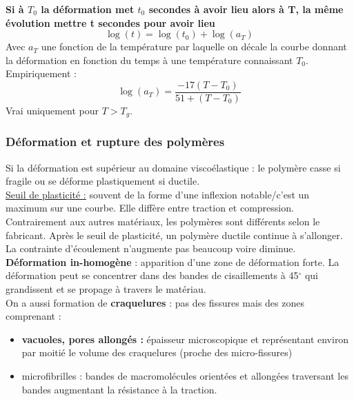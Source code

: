 \documentclass[../main.tex]{subfiles}
\begin{document}
\textbf{Si à $T_0$ la déformation met $t_0$ secondes à avoir lieu alors à T, la même évolution mettre t secondes pour avoir lieu}\\
\begin{equation}
    \log(t) = \log(t_0) + \log(a_T)
\end{equation}
Avec $a_T$ une fonction de la température par laquelle on décale la courbe donnant la déformation en fonction du temps à une température connaissant $T_0$. Empiriquement :\\
\begin{equation}
    \log(a_T) = \frac{-17(T-T_0)}{51+(T-T_0)}
\end{equation}
\warning Vrai uniquement pour $T>T_g$. \\

\subsubsection{Déformation et rupture des polymères}
Si la déformation est supérieur au domaine viscoélastique : le polymère casse si fragile ou se déforme plastiquement si ductile.\\

\quad \underline{Seuil de plasticité :} souvent de la forme d'une inflexion notable/c'est un maximum sur une courbe. Elle diffère entre traction et compression.\\

Contrairement aux autres matériaux, les polymères sont différents selon le fabricant. Après le seuil de plasticité, un polymère ductile continue à s'allonger. La contrainte d'écoulement n'augmente pas beaucoup voire diminue. \textbf{Déformation in-homogène} : apparition d'une zone de déformation forte. La déformation peut se concentrer dans des bandes de cisaillements à 45$^{\circ}$ qui grandissent et se propage à travers le matériau. \\
On a aussi formation de \textbf{craquelures} : pas des fissures mais des zones comprenant :\\
\begin{itemize}
    \item \textbf{vacuoles, pores allongés :} épaisseur microscopique et représentant environ par moitié le volume des craquelures (proche des micro-fissures)\\
    \item microfibrilles : bandes de macromolécules orientées et allongées traversant les bandes augmentant la résistance à la traction.\\
\end{itemize}
\end{document}
